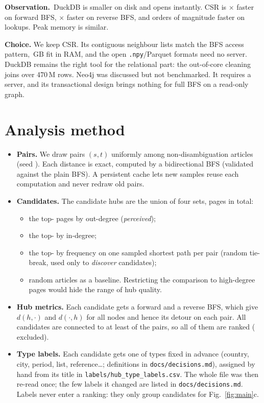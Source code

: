 \documentclass[10pt,a4paper]{article}
\newcommand{\obs}{\textbf{Observation.}~}
\begin{document}
\obs DuckDB is smaller on disk and opens instantly. CSR is \DuckBfsRatio$\times$ faster on
forward BFS, \DuckRevBfsRatio$\times$ faster on reverse BFS, and orders of magnitude faster on
lookups. Peak memory is similar.

\textbf{Choice.} We keep CSR. Its contiguous neighbour lists match the BFS access pattern, \CsrDiskGB\,GB
fit in RAM, and the open \texttt{.npy}/Parquet formats need no server. DuckDB remains the right
tool for the relational part: the out-of-core cleaning joins over 470\,M rows. Neo4j was discussed
but not benchmarked. It requires a server, and its transactional design brings nothing for full
BFS on a read-only graph.

\section{Analysis method}
\begin{itemize}
\item \textbf{Pairs.} We draw \NPairs{} pairs $(s,t)$ uniformly among non-disambiguation articles
  (seed \Seed). Each distance is exact, computed by a bidirectional BFS (validated against the
  plain BFS). A persistent cache lets new samples reuse each computation and never redraw old
  pairs.
\item \textbf{Candidates.} The candidate hubs are the union of four sets, \NCandidates{} pages in
  total:
  \begin{itemize}
  \item the top-\TopK{} pages by out-degree (\emph{perceived});
  \item the top-\TopK{} by in-degree;
  \item the top-\TopK{} by frequency on one sampled shortest path per pair (random tie-break, used
    only to \emph{discover} candidates);
  \item \NRandomBaseline{} random articles as a baseline. Restricting the comparison to high-degree
    pages would hide the range of hub quality.
  \end{itemize}
\item \textbf{Hub metrics.} Each candidate gets a forward and a reverse BFS, which give $d(h,\cdot)$
  and $d(\cdot,h)$ for all nodes and hence its detour on each pair. All candidates are connected
  to at least \MinCoverage{} of the pairs, so all of them are ranked (\NotRankable{} excluded).
\item \textbf{Type labels.} Each candidate gets one of \NTypeLabels{} types fixed in advance
  (country, city, period, list, reference\dots; definitions in \texttt{docs/decisions.md}),
  assigned by hand from its title in \texttt{labels/hub\_type\_labels.csv}. The whole file was
  then re-read once; the few labels it changed are listed in \texttt{docs/decisions.md}. Labels
  never enter a ranking: they only group candidates for Fig.~\ref{fig:main}c.
\end{itemize}
\end{document}
